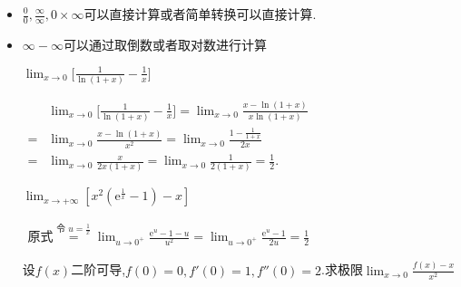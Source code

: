 \documentclass[12pt, a4paper, oneside, UTF8]{ctexbook}  %
\begin{document}
\begin{itemize}
    \item $\frac{0}{0},\frac{\infty}{\infty},0 \times \infty$可以直接计算或者简单转换可以直接计算.
    \item  $\infty -\infty$可以通过取倒数或者取对数进行计算\begin{problem}
          $\operatorname*{lim}_{x\to0}\bigg[{\frac{1}{\ln(1+x)}}-{\frac{1}{x}}\bigg]$
          \end{problem}
          \begin{solution}
              $
                  \begin{aligned}
                        & \lim_{x \to 0}\bigg[\frac{1}{\ln(1+x)}-\frac{1}{x}\bigg]= \lim_{x\to0}\frac{x-\ln(1+x)}{x\ln(1+x)} \\
                      = & \lim_{x\to0}\frac{x-\ln(1+x)}{x^2}=\lim_{x\to0}\frac{1-\frac{1}{1+x}}{2x}                          \\
                      = & \lim_{x\to0}\frac{x}{2x(1+x)}=\lim_{x\to0}\frac{1}{2(1+x)}=\frac{1}{2}.
                  \end{aligned}
              $
          \end{solution}
          \begin{problem}
          $\lim_{x\to+\infty}\left[x^2\left(\mathrm{e}^{\frac{1}{x}}-1\right)-x\right]$
          \end{problem}
          \begin{solution}
              $
                  \begin{aligned}
                      \text{原式}\overset{\text{令 }u=\frac1x}{\operatorname*{=}}\lim_{u\to0^+}\frac{\mathrm{e}^u-1-u}{u^2}=\lim_{u\to0^+}\frac{\mathrm{e}^u-1}{2u}=\frac12
                  \end{aligned}
              $
          \end{solution}
          \begin{problem}
          设$f(x)$二阶可导,$f(0)=0,f'(0)=1,f''(0)=2$.求极限$\lim_{x \to 0}\frac{f(x)-x}{x^2}$
          \end{problem}
\end{itemize}
\end{document}

